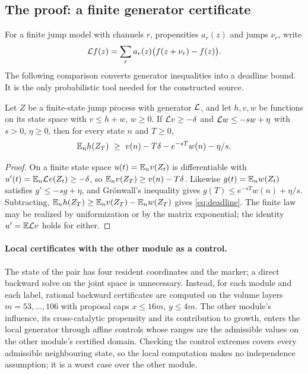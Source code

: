\subsection{The proof: a finite generator certificate}\label{sec:certificate}
For a finite jump model with channels $r$, propensities $a_r(z)$ and jumps $\nu_r$, write
\[
 \mathcal L f(z)=\sum_r a_r(z)\bigl(f(z+\nu_r)-f(z)\bigr).
\]
The following comparison converts generator inequalities into a deadline bound. It is the only probabilistic tool needed for the constructed source.

\begin{lemma}\label{lem:deadline}
Let $Z$ be a finite-state jump process with generator $\mathcal L$, and let $h,v,w$ be functions on its state space with $v\le h+w$, $w\ge0$. If $\mathcal L v\ge-\delta$ and $\mathcal L w\le-sw+\eta$ with $s>0$, $\eta\ge0$, then for every state $n$ and $T\ge0$,
\begin{equation}\label{eq:deadline}
 \mathbb E_n h(Z_T)\ \ge\ v(n)-T\delta-e^{-sT}w(n)-\eta/s.
\end{equation}
\end{lemma}
\begin{proof}
On a finite state space $u(t)=\mathbb E_nv(Z_t)$ is differentiable with $u'(t)=\mathbb E_n\mathcal L v(Z_t)\ge-\delta$, so $\mathbb E_nv(Z_T)\ge v(n)-T\delta$. Likewise $g(t)=\mathbb E_nw(Z_t)$ satisfies $g'\le-sg+\eta$, and Gr\"onwall's inequality gives $g(T)\le e^{-sT}w(n)+\eta/s$. Subtracting, $\mathbb E_nh(Z_T)\ge\mathbb E_nv(Z_T)-\mathbb E_nw(Z_T)$ gives \eqref{eq:deadline}. The finite law may be realized by uniformization or by the matrix exponential; the identity $u'=\mathbb E\mathcal L v$ holds for either.
\end{proof}

\paragraph{Local certificates with the other module as a control.}
The state of the pair has four resident coordinates and the marker; a direct backward solve on the joint space is unnecessary. Instead, for each module and each label, rational backward certificates are computed on the volume layers $m=53,\dots,106$ with proposal caps $x\le16m$, $y\le4m$. The other module's influence, its cross-catalytic propensity and its contribution to growth, enters the local generator through affine controls whose ranges are the admissible values on the other module's certified domain. Checking the control extremes covers every admissible neighbouring state, so the local computation makes no independence assumption; it is a worst case over the other module.

